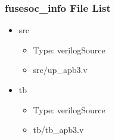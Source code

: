 \subsubsection{fusesoc\_info File List}
\begin{itemize}
\item src
	\begin{itemize}
	\item[$\space$] Type: verilogSource
	\item src/up\_apb3.v
	\end{itemize}
\item tb
	\begin{itemize}
	\item[$\space$] Type: verilogSource
	\item tb/tb\_apb3.v
	\end{itemize}
\end{itemize}
